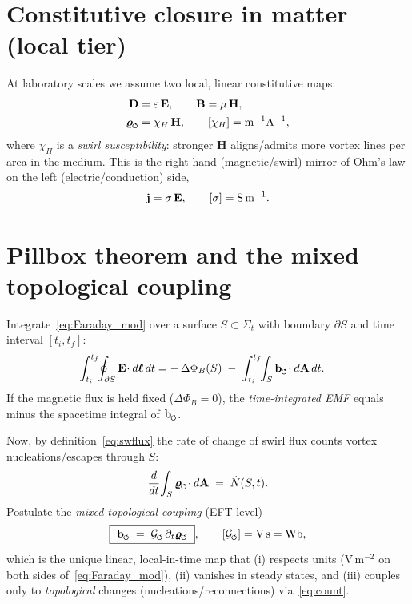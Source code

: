 \documentclass[11pt,a4paper]{article}
\newcommand{\swirlarrow}{%
    \mathchoice{\mkern-2mu\scriptstyle\boldsymbol{\circlearrowleft}}%
    {\mkern-2mu\scriptstyle\boldsymbol{\circlearrowleft}}%
    {\mkern-2mu\scriptscriptstyle\boldsymbol{\circlearrowleft}}%
    {\mkern-2mu\scriptscriptstyle\boldsymbol{\circlearrowleft}}%
}
\begin{document}
\section{Constitutive closure in matter (local tier)}
At laboratory scales we assume two local, linear constitutive maps:
\begin{align}
\mathbf D &= \varepsilon\,\mathbf E, \qquad \mathbf B = \mu\,\mathbf H, \\
\bm{\varrho}_{\rm \swirlarrow} &= \chi_H \,\mathbf H, \qquad [\chi_H] = {\rm m^{-1}A^{-1}},
\label{eq:local_const}
\end{align}
where $\chi_H$ is a \emph{swirl susceptibility}: stronger $\mathbf H$ aligns/admits more vortex lines per area in the medium. This is the right-hand (magnetic/swirl) mirror of Ohm’s law on the left (electric/conduction) side,
\begin{equation}
\mathbf j = \sigma\,\mathbf E,
\qquad [\sigma]={\rm S\,m^{-1}}.
\end{equation}

\section{Pillbox theorem and the mixed topological coupling}
Integrate~\eqref{eq:Faraday_mod} over a surface $S\subset \Sigma_t$ with boundary $\partial S$ and time interval $[t_i,t_f]$:
\begin{align}
\int_{t_i}^{t_f}\!\!\oint_{\partial S}\mathbf E\!\cdot d\boldsymbol\ell\,dt
&= -\,\Delta\Phi_B(S) \;-\; \int_{t_i}^{t_f}\!\!\int_S \mathbf b_{\rm \swirlarrow}\!\cdot d\mathbf A\,dt.
\label{eq:pillbox1}
\end{align}
If the magnetic flux is held fixed ($\Delta\Phi_B=0$), the \emph{time-integrated EMF} equals minus the spacetime integral of $\mathbf b_{\rm \swirlarrow}$.

Now, by definition~\eqref{eq:swflux} the rate of change of swirl flux counts vortex nucleations/escapes through $S$:
\begin{equation}
\frac{d}{dt}\!\int_S \bm{\varrho}_{\rm \swirlarrow}\!\cdot d\mathbf A \;=\; \dot N(S,t).
\label{eq:count}
\end{equation}
Postulate the \emph{mixed topological coupling} (EFT level)
\begin{equation}
\boxed{\ \mathbf b_{\rm \swirlarrow} \;=\; \mathcal G_{\rm \swirlarrow}\,\partial_t\bm{\varrho}_{\rm \swirlarrow}\ },
\qquad [\mathcal G_{\rm \swirlarrow}]={\rm V\,s}= {\rm Wb},
\label{eq:mix}
\end{equation}
which is the unique linear, local-in-time map that (i) respects units ($\mathrm{V\,m^{-2}}$ on both sides of~\eqref{eq:Faraday_mod}), (ii) vanishes in steady states, and (iii) couples only to \emph{topological} changes (nucleations/reconnections) via~\eqref{eq:count}.
\end{document}
